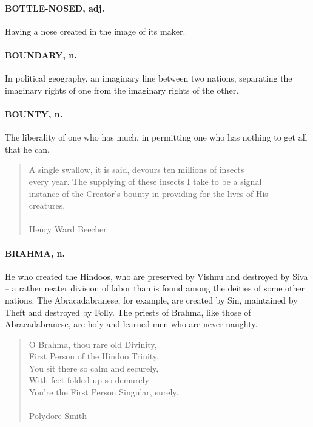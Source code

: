 \documentclass[11pt]{article}
\begin{document}
\paragraph{BOTTLE-NOSED, adj.}  Having a nose created in the image of its maker.

\paragraph{BOUNDARY, n.}  In political geography, an imaginary line between two
nations, separating the imaginary rights of one from the imaginary
rights of the other.

\paragraph{BOUNTY, n.}  The liberality of one who has much, in permitting one who
has nothing to get all that he can.

\begin{quote}       A single swallow, it is said, devours ten millions of insects \\
  every year.  The supplying of these insects I take to be a signal \\
  instance of the Creator's bounty in providing for the lives of His \\
  creatures. \\
 \\
Henry Ward Beecher \end{quote}


\paragraph{BRAHMA, n.}  He who created the Hindoos, who are preserved by Vishnu
and destroyed by Siva -- a rather neater division of labor than is
found among the deities of some other nations.  The Abracadabranese,
for example, are created by Sin, maintained by Theft and destroyed by
Folly.  The priests of Brahma, like those of Abracadabranese, are holy
and learned men who are never naughty.

\begin{quote}   O Brahma, thou rare old Divinity, \\
  First Person of the Hindoo Trinity, \\
  You sit there so calm and securely, \\
  With feet folded up so demurely -- \\
  You're the First Person Singular, surely. \\
 \\
Polydore Smith \end{quote}
\end{document}

